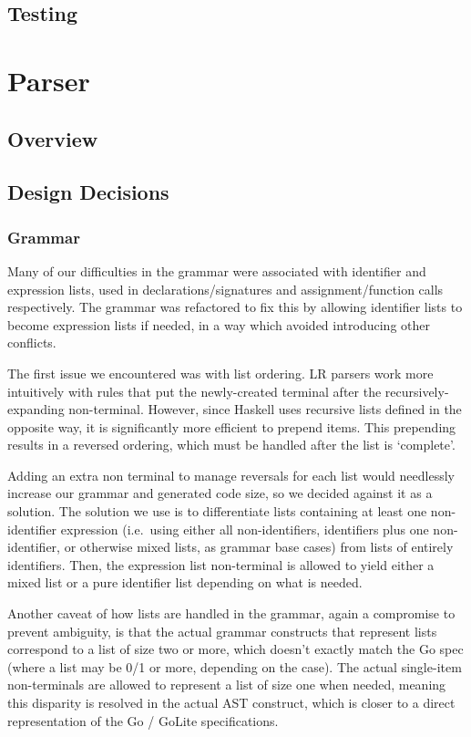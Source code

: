 \documentclass[11pt]{article}
\begin{document}
\subsection{Testing}
\section{Parser}
\subsection{Overview}
\subsection{Design Decisions}
\subsubsection{Grammar}
Many of our difficulties in the grammar were associated with identifier and
expression lists, used in declarations/signatures and assignment/function
calls respectively. The grammar was refactored to fix this by allowing
identifier lists to become expression lists if needed, in a way which
avoided introducing other conflicts.

The first issue we encountered was with list ordering. LR parsers
work more intuitively with rules that put the newly-created terminal
after the recursively-expanding non-terminal. However, since Haskell
uses recursive lists defined in the opposite way, it is significantly
more efficient to prepend items. This prepending results in a reversed
ordering, which must be handled after the list is `complete'.

Adding an extra non terminal to manage reversals for each list would
needlessly increase our grammar and generated code size, so we decided
against it as a solution. The solution we use is to differentiate
lists containing at least one non-identifier expression (i.e.\ using either
all non-identifiers, identifiers plus one non-identifier, or otherwise mixed
lists, as grammar base cases) from lists of entirely identifiers. Then,
the expression list non-terminal is allowed to yield either a mixed list
or a pure identifier list depending on what is needed.

Another caveat of how lists are handled in the grammar, again a
compromise to prevent ambiguity, is that the actual grammar constructs
that represent lists correspond to a list of size two or more, which
doesn't exactly match the Go spec (where a list may be 0/1 or more,
depending on the case). The actual single-item non-terminals are allowed
to represent a list of size one when needed, meaning this disparity
is resolved in the actual AST construct, which is closer to a direct
representation of the Go / GoLite specifications.
\end{document}
